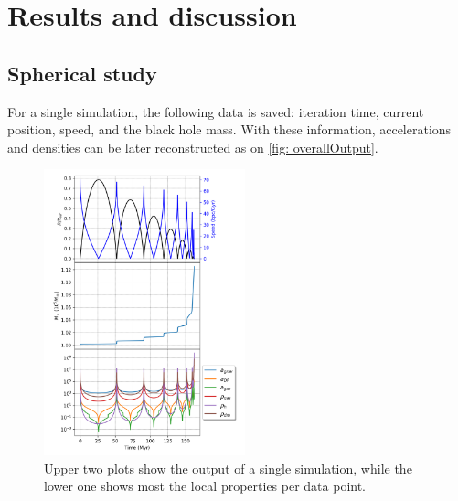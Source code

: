 
%



\chapter{Results and discussion}
	\section{Spherical study}
	For a single simulation, the following data is saved: iteration time, current position, speed, and the black hole mass. With these information, accelerations and densities can be later reconstructed as on \autoref{fig: overallOutput}.
	\begin{figure}[h]
		\centering
		\includegraphics[width = 0.52\textwidth]{"../Files/Week 6/properties_s02v70"}
		\caption{Upper two plots show the output of a single simulation, while the lower one shows most the local properties per data point.}
		\label{fig: overallOutput}
	\end{figure}
	
